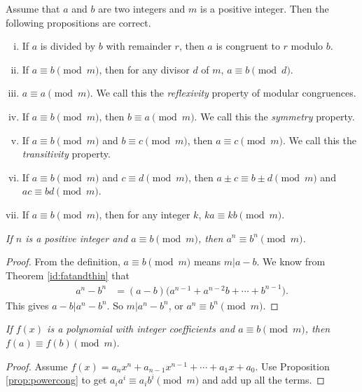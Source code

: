 \documentclass{subfile}
\begin{document}
	\begin{proposition}
		Assume that $a$ and $b$ are two integers and $m$ is a positive integer. Then the following propositions are correct.
			\begin{enumerate}[i.]
				\item If $a$ is divided by $b$ with remainder $r$, then $a$ is congruent to $r$ modulo $b$.
				\item If $a\equiv b\pmod m$, then for any divisor $d$ of $m$, $a\equiv b\pmod d$.
				\item $a \equiv a \pmod m$. We call this the \textit{reflexivity} property of modular congruences.
				\item If $a \equiv b \pmod m$, then $b \equiv a \pmod m$. We call this the \textit{symmetry} property.
				\item If $a \equiv b \pmod m$ and $b \equiv c \pmod m$, then $a \equiv c \pmod m$. We call this the \textit{transitivity} property.
				\item If $a \equiv b \pmod m$ and $c \equiv d \pmod m$, then $a\pm c \equiv b \pm d \pmod m$ and $ac \equiv bd \pmod m$.
				\item If $a \equiv b \pmod m$, then for any integer $k$, $ka \equiv kb \pmod m$.
			\end{enumerate}
	\end{proposition}
	
	\begin{proposition}\slshape\label{prop:powercong}
		If $n$ is a positive integer and $a \equiv b \pmod m$, then $a^n \equiv b^n \pmod m$.
	\end{proposition}
	
	\begin{proof}
		From the definition, $a \equiv b \pmod m$ means $m|a-b$. We know from Theorem \ref{id:fatandthin} that
		\begin{align*}
			a^n-b^n & = (a-b)\Big(a^{n-1}+a^{n-2}b+\cdots+b^{n-1}\Big).
		\end{align*}
		This gives $a-b | a^n-b^n$. So $m |a^n - b^n$, or $a^n \equiv b^n \pmod m$.
	\end{proof}	
	
	\begin{proposition}\slshape
		If $f(x)$ is a polynomial with integer coefficients and $a \equiv b \pmod m$, then $f(a) \equiv f(b) \pmod m$.
	\end{proposition}
	
	\begin{proof}
		Assume $f(x)=a_n x^n + a_{n-1} x^{n-1} + \cdots + a_1 x + a_0$. Use Proposition \eqref{prop:powercong} to get $a_i a^i \equiv a_i b^i \pmod m$ and add up all the terms.
	\end{proof}	
	
\end{document}
